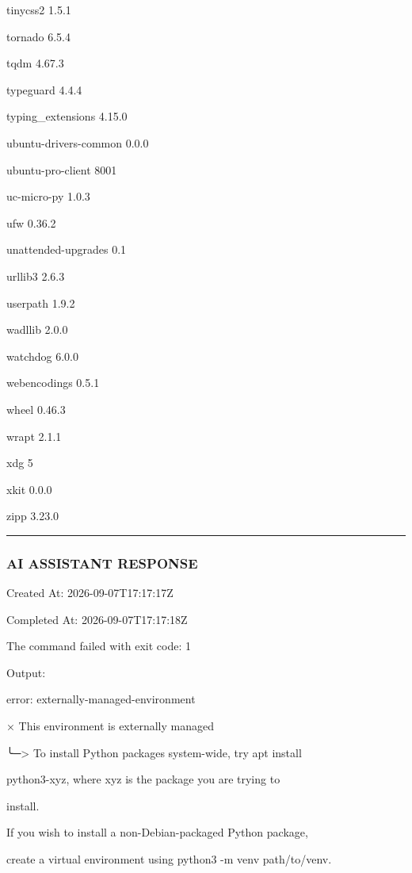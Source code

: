 \documentclass[11pt,a4paper]{article}
\begin{document}
tinycss2                  1.5.1

tornado                   6.5.4

tqdm                      4.67.3

typeguard                 4.4.4

typing\_extensions         4.15.0

ubuntu-drivers-common     0.0.0

ubuntu-pro-client         8001

uc-micro-py               1.0.3

ufw                       0.36.2

unattended-upgrades       0.1

urllib3                   2.6.3

userpath                  1.9.2

wadllib                   2.0.0

watchdog                  6.0.0

webencodings              0.5.1

wheel                     0.46.3

wrapt                     2.1.1

xdg                       5

xkit                      0.0.0

zipp                      3.23.0


\hrule

\subsubsection{AI ASSISTANT RESPONSE}

Created At: 2026-09-07T17:17:17Z

Completed At: 2026-09-07T17:17:18Z


The command failed with exit code: 1

Output:

error: externally-managed-environment


× This environment is externally managed

╰─> To install Python packages system-wide, try apt install

python3-xyz, where xyz is the package you are trying to

install.


If you wish to install a non-Debian-packaged Python package,

create a virtual environment using python3 -m venv path/to/venv.
\end{document}
